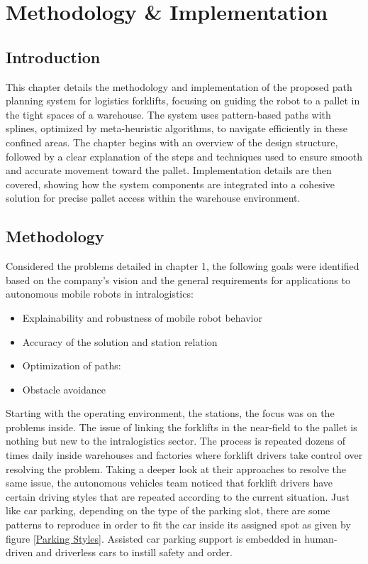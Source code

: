 \chapter{Methodology \& Implementation}

\renewcommand{\chaptername}{Chapter}
\section*{Introduction}

This chapter details the methodology and implementation of the proposed path planning system for logistics forklifts, 
focusing on guiding the robot to a pallet in the tight spaces of a warehouse. The system uses pattern-based paths with 
splines, optimized by meta-heuristic algorithms, to navigate efficiently in these confined areas. The chapter begins with 
an overview of the design structure, followed by a clear explanation of the steps and techniques used to ensure 
smooth and accurate movement toward the pallet. Implementation details are then covered, showing how the system 
components are integrated into a cohesive solution for precise pallet access within the warehouse environment.

\section{Methodology }
Considered the problems detailed in chapter 1, the following goals were identified based on the company's vision and the 
general requirements for applications to autonomous mobile robots in intralogistics:
\begin{itemize}
    \item Explainability and robustness of mobile robot behavior
    \item Accuracy of the solution and station relation
    \item Optimization of paths:
    \item Obstacle avoidance
\end{itemize}

Starting with the operating environment, the stations, the focus was on the problems inside. The issue of linking 
the forklifts in the near-field to the pallet is nothing but new to the intralogistics sector. 
The process is repeated dozens of times daily inside warehouses and factories where forklift drivers take control over 
resolving the problem. Taking a deeper look at their approaches to resolve the same issue, the autonomous vehicles team 
noticed that forklift drivers have certain driving styles that are repeated according to the current situation.
Just like car parking, depending on the type of the parking slot, there are some patterns to reproduce in order to fit 
the car inside its assigned spot as given by figure \ref{Parking Styles}. Assisted car parking support is 
embedded in human-driven and driverless cars to instill safety and order.

